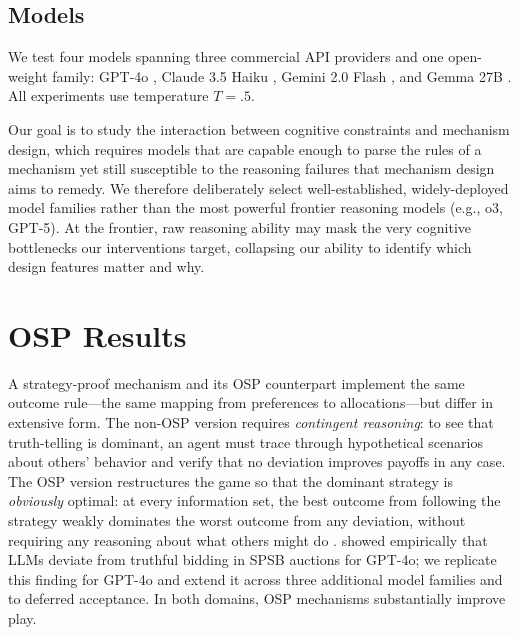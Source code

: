 \documentclass[format=acmsmall, review=false]{acmart}
\begin{document}
\subsection{Models}

We test four models spanning three commercial API providers and one open-weight family: GPT-4o \citep{openai2024gpt4o}, Claude 3.5 Haiku \citep{anthropic2024claude}, Gemini 2.0 Flash \citep{google2024gemini}, and Gemma 27B \citep{google2024gemma}. All experiments use temperature $T=.5$.

Our goal is to study the interaction between cognitive constraints and mechanism design, which requires models that are capable enough to parse the rules of a mechanism yet still susceptible to the reasoning failures that mechanism design aims to remedy. We therefore deliberately select well-established, widely-deployed model families rather than the most powerful frontier reasoning models (e.g., o3, GPT-5). At the frontier, raw reasoning ability may mask the very cognitive bottlenecks our interventions target, collapsing our ability to identify which design features matter and why.


\section{OSP Results} \label{sec:osp-results}

A strategy-proof mechanism and its OSP counterpart implement the same outcome rule---the same mapping from preferences to allocations---but differ in extensive form. The non-OSP version requires {\em contingent reasoning}: to see that truth-telling is dominant, an agent must trace through hypothetical scenarios about others' behavior and verify that no deviation improves payoffs in any case. The OSP version restructures the game so that the dominant strategy is {\em obviously} optimal: at every information set, the best outcome from following the strategy weakly dominates the worst outcome from any deviation, without requiring any reasoning about what others might do \citep{li2017obviously}. \citet{zhu2024evidence} showed empirically that LLMs deviate from truthful bidding in SPSB auctions for GPT-4o; we replicate this finding for GPT-4o and extend it across three additional model families and to deferred acceptance. In both domains, OSP mechanisms substantially improve play.
\end{document}
